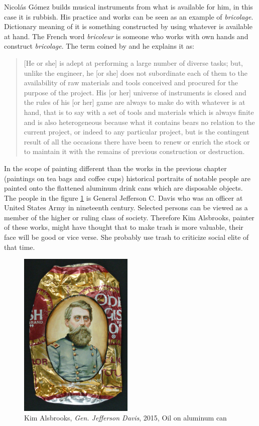 Nicolás Gómez builds musical instruments from what is available for him, in this case it is rubbish. His practice and works can be seen as an example of \textit{bricolage}. Dictionary meaning of it is something constructed by using whatever is available at hand. The French word \textit{bricoleur} is someone who works with own hands and construct \textit{bricolage}. The term coined by \citet[17]{levi1966savage} and he explains it as:

\begin{quote}
[He or she] is adept at performing a large number of diverse tasks; but, unlike the engineer, he [or she] does not subordinate each of them to the availability of raw materials and tools conceived and procured for the purpose of the project. His [or her] universe of instruments is closed and the rules of his [or her] game are always to make do with whatever is at hand, that is to say with a set of tools and materials which is always finite and is also heterogeneous because what it contains bears no relation to the current project, or indeed to any particular project, but is the contingent result of all the occasions there have been to renew or enrich the stock or to maintain it with the remains of previous construction or destruction.
\end{quote}

In the scope of painting different than the works in the previous chapter (paintings on tea bags and coffee cups) historical portraits of notable people are painted onto the flattened aluminum drink cans which are disposable objects. The people in the figure \ref{fig:Alsbrooks} is General Jefferson C. Davis who was an officer at United States Army in nineteenth century. Selected persons can be viewed as a member of the higher or ruling class of society. Therefore Kim Alsbrooks, painter of these works, might have thought that to make trash is more valuable, their face will be good or vice verse. She probably use trash to criticize social elite of that time. 

\begin{figure}[h!]
  \centering
  \includegraphics[height=8cm]{graphics/Alsbrooks.jpg}
  \caption{Kim Alsbrooks, \textit{Gen. Jefferson Davis}, 2015, Oil on aluminum can}
  \label{fig:Alsbrooks}
\end{figure}


